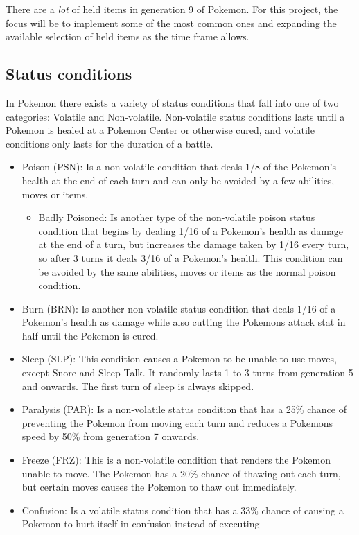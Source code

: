 There are a \textit{lot} of held items in generation 9 of Pokemon. For this project, the focus will be to implement some of the most common ones and expanding the available selection of held items as the time frame allows. 

\subsection{Status conditions}
In Pokemon there exists a variety of status conditions that fall into one of two categories: Volatile and Non-volatile. Non-volatile status conditions
lasts until a Pokemon is healed at a Pokemon Center or otherwise cured, and volatile conditions only lasts for the duration of a battle. \cite{StatusCondition}
\begin{itemize}
  \item Poison (PSN): Is a non-volatile condition that deals 1/8 of the Pokemon's health at the end of each turn and can only be avoided by a few abilities,
  moves or items.
  \begin{itemize}
    \item Badly Poisoned: Is another type of the non-volatile poison status condition that begins by dealing 1/16 of a Pokemon's health as damage at the end of a turn, 
      but increases the damage taken by 1/16 every turn, so after 3 turns it deals 3/16 of a Pokemon's health. 
      This condition can be avoided by the same abilities, moves or items as the normal poison condition.
  \end{itemize}
  \item Burn (BRN): Is another non-volatile status condition that deals 1/16 of a Pokemon's health as damage while also cutting the Pokemons attack stat
    in half until the Pokemon is cured. 
  \item Sleep (SLP): This condition causes a Pokemon to be unable to use moves, except Snore and Sleep Talk. 
    It randomly lasts 1 to 3 turns from generation 5 and onwards. The first turn of sleep is always skipped.
  \item Paralysis (PAR): Is a non-volatile status condition that has a 25\% chance of preventing the Pokemon from moving each turn and reduces a Pokemons
    speed by 50\% from generation 7 onwards.
  \item Freeze (FRZ): This is a non-volatile condition that renders the Pokemon unable to move. The Pokemon has a 20\% chance of thawing out each turn, but 
    certain moves causes the Pokemon to thaw out immediately.
  \item Confusion: Is a volatile status condition that has a 33\% chance of causing a Pokemon to hurt itself in confusion instead of executing

\end{itemize}
